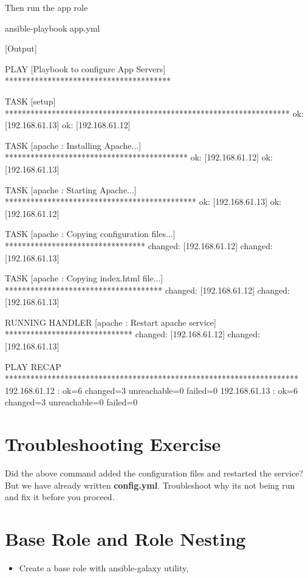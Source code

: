 Then run the app role

\begin{code}
ansible-playbook app.yml
\end{code}

[Output]\newline
\begin{code}
PLAY [Playbook to configure App Servers] ***************************************

TASK [setup] *******************************************************************
ok: [192.168.61.13]
ok: [192.168.61.12]

TASK [apache : Installing Apache...] *******************************************
ok: [192.168.61.12]
ok: [192.168.61.13]

TASK [apache : Starting Apache...] *********************************************
ok: [192.168.61.13]
ok: [192.168.61.12]

TASK [apache : Copying configuration files...] *********************************
changed: [192.168.61.12]
changed: [192.168.61.13]

TASK [apache : Copying index.html file...] *************************************
changed: [192.168.61.12]
changed: [192.168.61.13]

RUNNING HANDLER [apache : Restart apache service] ******************************
changed: [192.168.61.12]
changed: [192.168.61.13]

PLAY RECAP *********************************************************************
192.168.61.12              : ok=6    changed=3    unreachable=0    failed=0
192.168.61.13              : ok=6    changed=3    unreachable=0    failed=0
\end{code}

\section{Troubleshooting Exercise}

Did the above command added the configuration files and restarted the service? But we have already written \textbf{config.yml}. Troubleshoot why its not being run and fix it before you proceed.

\section{Base Role and Role Nesting}

\begin{itemize}
\item Create a base role with ansible-galaxy utility,
\end{itemize}

